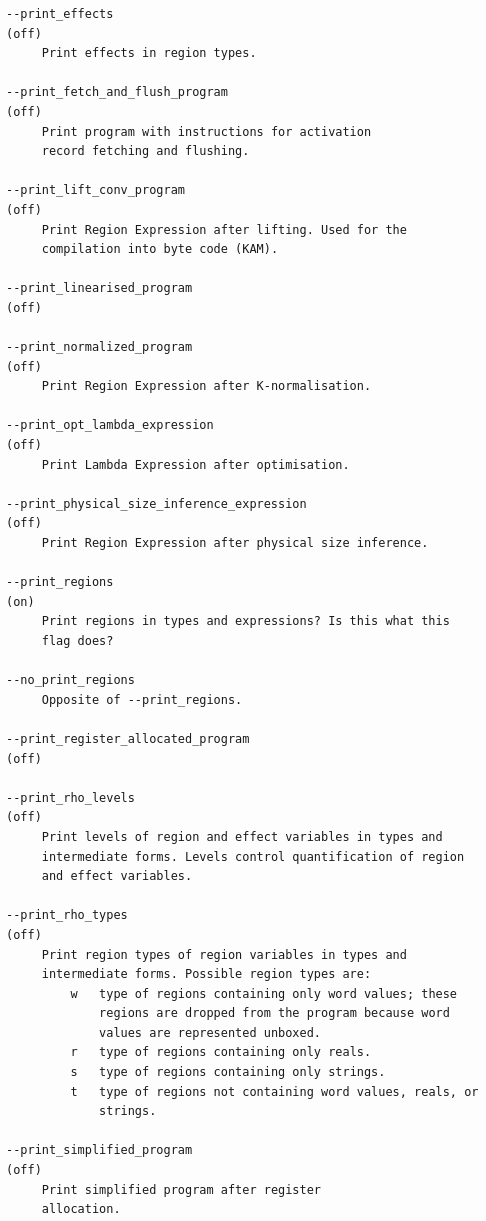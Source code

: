 \documentclass[12pt]{book}
\begin{document}
{\begin{verbatim}
--print_effects                                                     (off)
     Print effects in region types.

--print_fetch_and_flush_program                                     (off)
     Print program with instructions for activation
     record fetching and flushing.

--print_lift_conv_program                                           (off)
     Print Region Expression after lifting. Used for the
     compilation into byte code (KAM).

--print_linearised_program                                          (off)

--print_normalized_program                                          (off)
     Print Region Expression after K-normalisation.

--print_opt_lambda_expression                                       (off)
     Print Lambda Expression after optimisation.

--print_physical_size_inference_expression                          (off)
     Print Region Expression after physical size inference.

--print_regions                                                      (on)
     Print regions in types and expressions? Is this what this
     flag does?

--no_print_regions
     Opposite of --print_regions.

--print_register_allocated_program                                  (off)

--print_rho_levels                                                  (off)
     Print levels of region and effect variables in types and
     intermediate forms. Levels control quantification of region
     and effect variables.

--print_rho_types                                                   (off)
     Print region types of region variables in types and
     intermediate forms. Possible region types are:
         w   type of regions containing only word values; these
             regions are dropped from the program because word
             values are represented unboxed.
         r   type of regions containing only reals.
         s   type of regions containing only strings.
         t   type of regions not containing word values, reals, or
             strings.

--print_simplified_program                                          (off)
     Print simplified program after register
     allocation.


\end{verbatim}}
\end{document}
